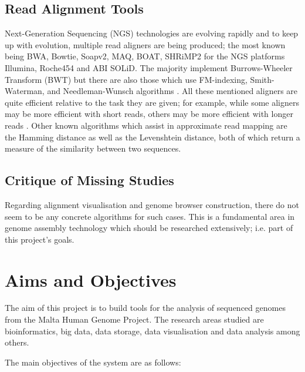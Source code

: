 \documentclass{csfyp}
\begin{document}
\subsection{Read Alignment Tools}
Next-Generation Sequencing (NGS) technologies are evolving rapidly and to keep up with evolution, multiple read aligners are being produced; the most known being BWA, Bowtie, Soapv2, MAQ, BOAT, SHRiMP2 for the NGS platforms Illumina, Roche454 and ABI SOLiD.  The majority implement Burrows-Wheeler Transform (BWT) but there are also those which use FM-indexing, Smith-Waterman,  and Needleman-Wunsch algorithms \cite{bwtransform, popgen, cgreads}.  All these mentioned aligners are quite efficient relative to the task they are given; for example, while some aligners may be more efficient with short reads, others may be more efficient with longer reads \cite{companalys, compalign}.  Other known algorithms which assist in approximate read mapping are the Hamming distance as well as the Levenshtein distance, both of which return a measure of the similarity between two sequences.

\subsection{Critique of Missing Studies}
Regarding alignment visualisation and genome browser construction, there do not seem to be any concrete algorithms for such cases.  This is a fundamental area in genome assembly technology which should be researched extensively; i.e. part of this project's goals.     

\section{Aims and Objectives}

The aim of this project is to build tools for the analysis of sequenced genomes from the Malta Human Genome Project.  The research areas studied are bioinformatics, big data, data storage, data visualisation and data analysis among others.

The main objectives of the system are as follows:
\end{document}
